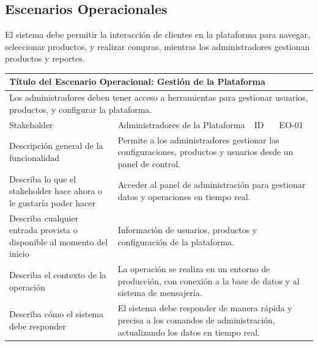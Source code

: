 \documentclass[12pt]{article}
\begin{document}
\subsection{Escenarios Operacionales}
El sistema debe permitir la interacción de clientes en la plataforma para navegar, seleccionar productos, y realizar compras, mientras los administradores gestionan productos y reportes.

\begin{table}[H]
    \centering
    \begin{tabular}{|p{4cm}|p{4cm}|p{4cm}|p{4cm}|}
        \hline
        \multicolumn{4}{|l|}{\cellcolor{teal!50}\textbf{Título del Escenario Operacional: Gestión de la Plataforma}} \\ \hline
        \multicolumn{4}{|p{16cm}|}{Los administradores deben tener acceso a herramientas para gestionar usuarios, productos, y configurar la plataforma.} \\ \hline
        \multicolumn{1}{|p{4cm}|}{\cellcolor{teal!50}Stakeholder} & \multicolumn{1}{p{6cm}|}{Administradores de la Plataforma} & \multicolumn{1}{|p{2cm}|}{\cellcolor{teal!50}ID} & \multicolumn{1}{p{4cm}|}{EO-01} \\ \hline
        \multicolumn{1}{|p{4cm}|}{\cellcolor{teal!50}Descripción general de la funcionalidad} & \multicolumn{3}{p{12cm}|}{Permite a los administradores gestionar las configuraciones, productos y usuarios desde un panel de control.} \\ \hline
        \multicolumn{1}{|p{4cm}|}{\cellcolor{teal!50}Describa lo que el stakeholder hace ahora o le gustaría poder hacer} & \multicolumn{3}{p{12cm}|}{Acceder al panel de administración para gestionar datos y operaciones en tiempo real.} \\ \hline
        \multicolumn{1}{|p{4cm}|}{\cellcolor{teal!50}Describa cualquier entrada provista o disponible al momento del inicio} & \multicolumn{3}{p{12cm}|}{Información de usuarios, productos y configuración de la plataforma.} \\ \hline
        \multicolumn{1}{|p{4cm}|}{\cellcolor{teal!50}Describa el contexto de la operación} & \multicolumn{3}{p{12cm}|}{La operación se realiza en un entorno de producción, con conexión a la base de datos y al sistema de mensajería.} \\ \hline
        \multicolumn{1}{|p{4cm}|}{\cellcolor{teal!50}Describa cómo el sistema debe responder} & \multicolumn{3}{p{12cm}|}{El sistema debe responder de manera rápida y precisa a los comandos de administración, actualizando los datos en tiempo real.} \\ \hline

\end{tabular}
\end{table}
\end{document}
